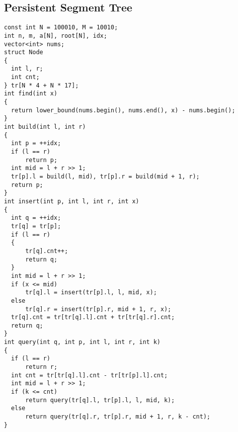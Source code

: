 \subsection{Persistent Segment Tree}
\begin{lstlisting}
const int N = 100010, M = 10010;
int n, m, a[N], root[N], idx;
vector<int> nums;
struct Node
{
  int l, r;
  int cnt;
} tr[N * 4 + N * 17];
int find(int x)
{
  return lower_bound(nums.begin(), nums.end(), x) - nums.begin();
}
int build(int l, int r)
{
  int p = ++idx;
  if (l == r)
      return p;
  int mid = l + r >> 1;
  tr[p].l = build(l, mid), tr[p].r = build(mid + 1, r);
  return p;
}
int insert(int p, int l, int r, int x)
{
  int q = ++idx;
  tr[q] = tr[p];
  if (l == r)
  {
      tr[q].cnt++;
      return q;
  }
  int mid = l + r >> 1;
  if (x <= mid)
      tr[q].l = insert(tr[p].l, l, mid, x);
  else
      tr[q].r = insert(tr[p].r, mid + 1, r, x);
  tr[q].cnt = tr[tr[q].l].cnt + tr[tr[q].r].cnt;
  return q;
}
int query(int q, int p, int l, int r, int k)
{
  if (l == r)
      return r;
  int cnt = tr[tr[q].l].cnt - tr[tr[p].l].cnt;
  int mid = l + r >> 1;
  if (k <= cnt)
      return query(tr[q].l, tr[p].l, l, mid, k);
  else
      return query(tr[q].r, tr[p].r, mid + 1, r, k - cnt);
}
\end{lstlisting}
